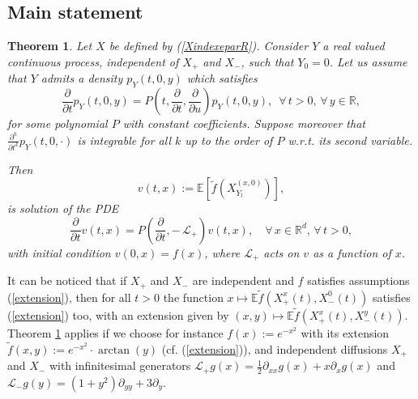 \documentclass[a4paper, 11pt]{article}
\newtheorem{thm}{Theorem}%
\newcommand{\R}{\mathbb{R}}
\newcommand{\E}{\mathbb{E}}
\newcommand{\1}{\mathbf{1}}
\begin{document}
\subsection{Main statement}
\begin{thm}
\label{edpsansf} 
Let $X$ be defined by (\ref{XindexeparR}). Consider $Y$ a real valued continuous process, independent of $X_+$ and $X_-$, such that $Y_0=0$. Let us assume that $Y$ admits a density $p_Y(t,0,y)$ which satisfies
\begin{equation*}
\frac{\partial}{ \partial t}p_Y(t,0,y)=P(t,\frac{\partial}{ \partial t},\frac{\partial}{ \partial u})p_Y(t,0,y),\, \, \, \forall\,  t>0,\, \forall\,  y\in \R,
\end{equation*}
for some polynomial $P$ with constant coefficients. Suppose moreover that $\frac{\partial^k}{ \partial t^k}p_Y(t,0,\cdot)$ is integrable for all $k$ up to the order of $P$ w.r.t. its second variable. 

Then 
\begin{equation*}\label{sansf}
v(t,x):=\E\left[\tilde{f}(X^{(x,0)}_{Y_t})\right],
\end{equation*}
is solution of the PDE
\begin{equation}\label{FK}
  \frac{\partial}{\partial t}v(t,x)=P(\frac{\partial}{ \partial t},-\, \mathcal{L}_+)v(t,x),\quad \forall \, x\in \R^d,\, \forall\,  t>0,
\end{equation}
with initial condition $v(0,x)=f(x)$, where $\mathcal{L}_+$ acts on $v$ as a function of $x$.
\end{thm}

\bigskip

\noindent It can be noticed that if $X_+$ and $X_-$ are independent and $f$ satisfies assumptions (\ref{extension}), then for all $t>0$ the function $x\mapsto \E \tilde{f}(X_+^x(t),X_-^0(t))$ satisfies (\ref{extension}) too, with an extension given by $(x,y)\mapsto \E \tilde{f}(X_+^x(t),X_-^y(t))$.\\
Theorem \ref{edpsansf} applies if we choose for instance $f(x):=e^{-x^2}$ with its extension $\tilde{f}(x,y):=e^{-x^2}\cdot \arctan(y)$ (cf. (\ref{extension})), and independent diffusions $X_+$ and $X_-$ with infinitesimal generators $\mathcal{L}_+g(x)=\frac{1}{2}\partial_{xx}g(x)+x\partial_xg(x)$ and $\mathcal{L}_-g(y)=(1+y^2)\partial_{yy}+3\partial_y$.

\bigskip
\end{document}
